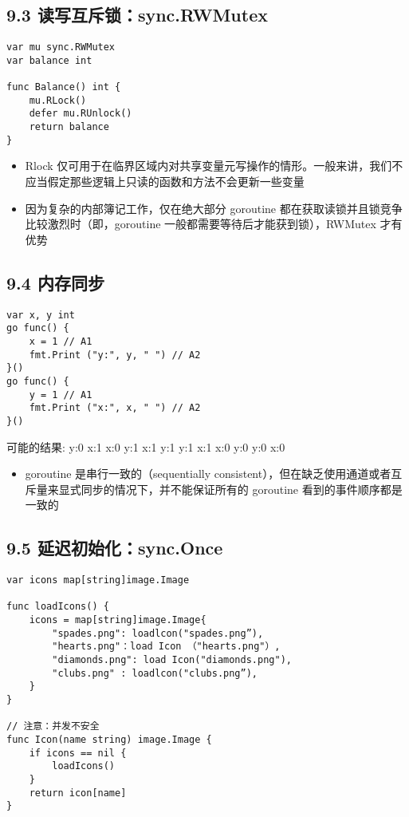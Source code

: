 \hypertarget{ux8bfbux5199ux4e92ux65a5ux9501sync.rwmutex}{%
\subsection{9.3
读写互斥锁：sync.RWMutex}\label{ux8bfbux5199ux4e92ux65a5ux9501sync.rwmutex}}

\begin{verbatim}
var mu sync.RWMutex
var balance int

func Balance() int {
    mu.RLock()
    defer mu.RUnlock()
    return balance
}
\end{verbatim}

\begin{itemize}
\tightlist
\item
  Rlock
  仅可用于在临界区域内对共享变量元写操作的情形。一般来讲，我们不应当假定那些逻辑上只读的函数和方法不会更新一些变量
\item
  因为复杂的内部簿记工作，仅在绝大部分 goroutine
  都在获取读锁并且锁竞争比较激烈时（即，goroutine
  一般都需要等待后才能获到锁），RWMutex 才有优势
\end{itemize}

\hypertarget{ux5185ux5b58ux540cux6b65}{%
\subsection{9.4 内存同步}\label{ux5185ux5b58ux540cux6b65}}

\begin{verbatim}
var x, y int
go func() {
    x = 1 // A1
    fmt.Print ("y:", y, " ") // A2
}()
go func() {
    y = 1 // A1
    fmt.Print ("x:", x, " ") // A2
}()
\end{verbatim}

可能的结果: y:0 x:1 x:0 y:1 x:1 y:1 y:1 x:1 x:0 y:0 y:0 x:0

\begin{itemize}
\tightlist
\item
  goroutine 是串行一致的（sequentially
  consistent），但在缺乏使用通道或者互斥量来显式同步的情况下，并不能保证所有的
  goroutine 看到的事件顺序都是一致的
\end{itemize}

\hypertarget{ux5ef6ux8fdfux521dux59cbux5316sync.once}{%
\subsection{9.5
延迟初始化：sync.Once}\label{ux5ef6ux8fdfux521dux59cbux5316sync.once}}

\begin{verbatim}
var icons map[string]image.Image

func loadIcons() {
    icons = map[string]image.Image{
        "spades.png": loadlcon("spades.png”),
        "hearts.png"：load Icon （"hearts.png"）,
        "diamonds.png": load Icon("diamonds.png"),
        "clubs.png" : loadlcon("clubs.png”),
    }
}

// 注意：并发不安全
func Icon(name string) image.Image {
    if icons == nil {
        loadIcons()
    }
    return icon[name]
}
\end{verbatim}


